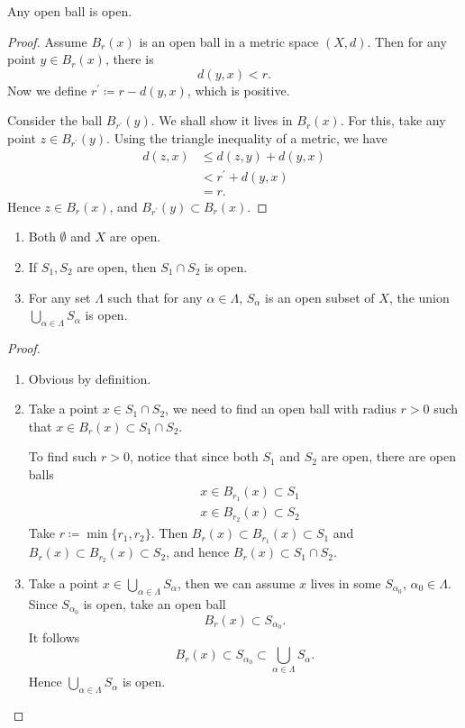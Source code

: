 \begin{proposition}
Any open ball is open.
\end{proposition}

\begin{proof}
Assume $B_r(x)$ is an open ball in a metric space $(X,d)$. Then for any point $y\in B_r(x)$, there is
\[ d(y,x)<r. \]
Now we define $r^\prime\coloneqq r-d(y,x)$, which is positive.

Consider the ball $B_{r^\prime}(y)$. We shall show it lives in $B_r(x)$. For this, take any point $z\in B_{r^\prime}(y)$. Using the triangle inequality of a metric, we have
\begin{align*}
d(z,x)&\le d(z,y)+d(y,x)\\
&<r^\prime+d(y,x)\\
&=r.
\end{align*}
Hence $z\in B_r(x)$, and $B_{r^\prime}(y)\subset B_r(x)$.
\end{proof}

\begin{proposition}
\begin{enumerate}[label=(\arabic*)]
\item Both $\emptyset$ and $X$ are open.
\item If $S_1,S_2$ are open, then $S_1\cap S_2$ is open.
\item For any set $\Lambda$ such that for any $\alpha\in\Lambda$, $S_\alpha$ is an open subset of $X$, the union $\bigcup_{\alpha\in\Lambda}S_\alpha$ is open.
\end{enumerate}
\end{proposition}

\begin{proof} \
\begin{enumerate}[label=(\arabic*)]
\item Obvious by definition.
\item Take a point $x\in S_1\cap S_2$, we need to find an open ball with radius $r>0$ such that $x\in B_r(x)\subset S_1\cap S_2$.

To find such $r>0$, notice that since both $S_1$ and $S_2$ are open, there are open balls
\begin{align*}
&x\in B_{r_1}(x)\subset S_1\\
&x\in B_{r_2}(x)\subset S_2
\end{align*}
Take $r\coloneqq\min\{r_1,r_2\}$. Then $B_r(x)\subset B_{r_1}(x)\subset S_1$ and $B_r(x)\subset B_{r_2}(x)\subset S_2$, and hence $B_r(x)\subset S_1\cap S_2$.

\item Take a point $x\in\bigcup_{\alpha\in\Lambda}S_\alpha$, then we can assume $x$ lives in some $S_{\alpha_0}$, $\alpha_0\in\Lambda$. Since $S_{\alpha_0}$ is open, take an open ball 
\[ B_r(x)\subset S_{\alpha_0}. \]
It follows
\[ B_r(x)\subset S_{\alpha_0}\subset\bigcup_{\alpha\in\Lambda}S_\alpha. \]
Hence $\bigcup_{\alpha\in\Lambda}S_\alpha$ is open.
\end{enumerate}
\end{proof}

